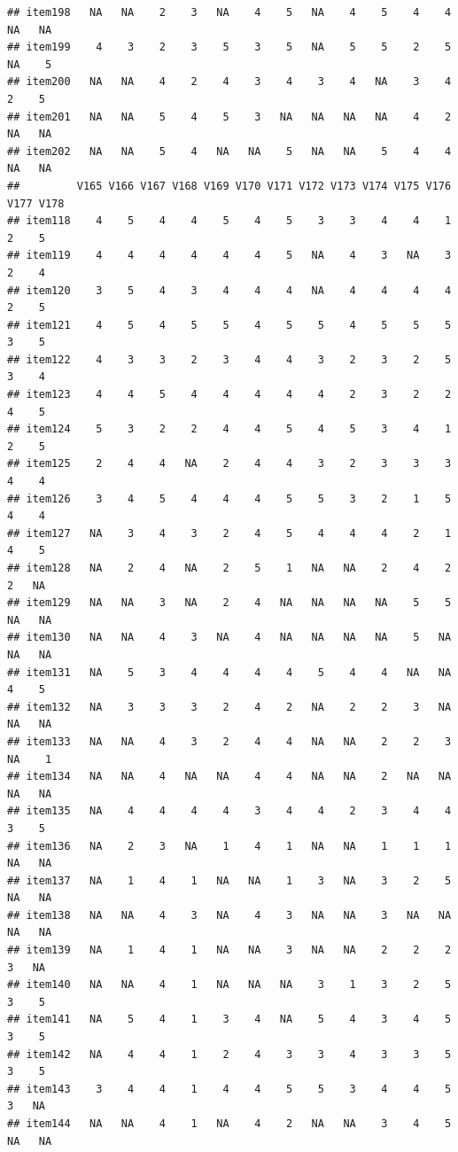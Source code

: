 \documentclass[
  man]{apa6}
\begin{document}
\begin{verbatim}
## item198   NA   NA    2    3   NA    4    5   NA    4    5    4    4   NA   NA
## item199    4    3    2    3    5    3    5   NA    5    5    2    5   NA    5
## item200   NA   NA    4    2    4    3    4    3    4   NA    3    4    2    5
## item201   NA   NA    5    4    5    3   NA   NA   NA   NA    4    2   NA   NA
## item202   NA   NA    5    4   NA   NA    5   NA   NA    5    4    4   NA   NA
##         V165 V166 V167 V168 V169 V170 V171 V172 V173 V174 V175 V176 V177 V178
## item118    4    5    4    4    5    4    5    3    3    4    4    1    2    5
## item119    4    4    4    4    4    4    5   NA    4    3   NA    3    2    4
## item120    3    5    4    3    4    4    4   NA    4    4    4    4    2    5
## item121    4    5    4    5    5    4    5    5    4    5    5    5    3    5
## item122    4    3    3    2    3    4    4    3    2    3    2    5    3    4
## item123    4    4    5    4    4    4    4    4    2    3    2    2    4    5
## item124    5    3    2    2    4    4    5    4    5    3    4    1    2    5
## item125    2    4    4   NA    2    4    4    3    2    3    3    3    4    4
## item126    3    4    5    4    4    4    5    5    3    2    1    5    4    4
## item127   NA    3    4    3    2    4    5    4    4    4    2    1    4    5
## item128   NA    2    4   NA    2    5    1   NA   NA    2    4    2    2   NA
## item129   NA   NA    3   NA    2    4   NA   NA   NA   NA    5    5   NA   NA
## item130   NA   NA    4    3   NA    4   NA   NA   NA   NA    5   NA   NA   NA
## item131   NA    5    3    4    4    4    4    5    4    4   NA   NA    4    5
## item132   NA    3    3    3    2    4    2   NA    2    2    3   NA   NA   NA
## item133   NA   NA    4    3    2    4    4   NA   NA    2    2    3   NA    1
## item134   NA   NA    4   NA   NA    4    4   NA   NA    2   NA   NA   NA   NA
## item135   NA    4    4    4    4    3    4    4    2    3    4    4    3    5
## item136   NA    2    3   NA    1    4    1   NA   NA    1    1    1   NA   NA
## item137   NA    1    4    1   NA   NA    1    3   NA    3    2    5   NA   NA
## item138   NA   NA    4    3   NA    4    3   NA   NA    3   NA   NA   NA   NA
## item139   NA    1    4    1   NA   NA    3   NA   NA    2    2    2    3   NA
## item140   NA   NA    4    1   NA   NA   NA    3    1    3    2    5    3    5
## item141   NA    5    4    1    3    4   NA    5    4    3    4    5    3    5
## item142   NA    4    4    1    2    4    3    3    4    3    3    5    3    5
## item143    3    4    4    1    4    4    5    5    3    4    4    5    3   NA
## item144   NA   NA    4    1   NA    4    2   NA   NA    3    4    5   NA   NA

\end{verbatim}
\end{document}
